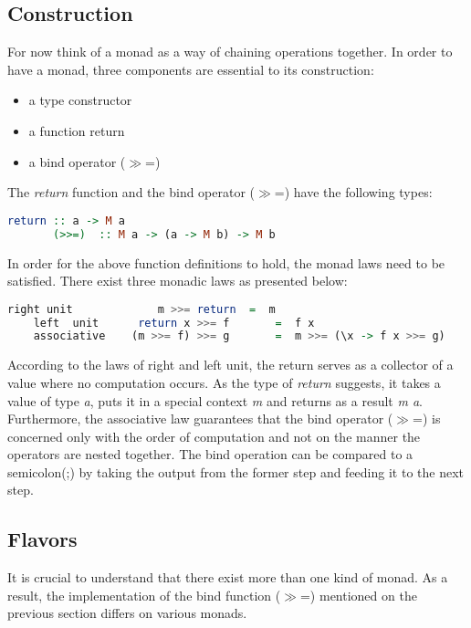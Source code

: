 \documentclass[a4paper, onecolumn]{article}
\begin{document}
    \subsection{Construction}
    For now think of a monad as a way of chaining operations together. 
    In order to have a monad, three components are essential to its construction: 
    \begin{itemize}
        \item a type constructor
        \item a function return
        \item a bind operator ($\gg$=)
    \end{itemize}
    The \textit{return} function and the bind operator ($\gg$=) have the following types: 
    \begin{tcolorbox}
      \begin{lstlisting}[language=Haskell]
       return :: a -> M a 
       (>>=)  :: M a -> (a -> M b) -> M b 
      \end{lstlisting}
    \end{tcolorbox}
    In order for the above function definitions to hold, the monad laws need to be satisfied. There exist three monadic laws as presented below: 
    \begin{tcolorbox}
      \begin{lstlisting}[language=Haskell]
    right unit             m >>= return  =  m 
    left  unit      return x >>= f       =  f x   
    associative    (m >>= f) >>= g       =  m >>= (\x -> f x >>= g) 
      \end{lstlisting}
    \end{tcolorbox}
    
    According to the laws of right and left unit, the return serves as a collector of a value where no computation occurs. As the type of \textit{return} suggests, it takes a value of type \textit{a}, puts it in a special context \textit{m} and returns as a result \textit{m a}. Furthermore, the associative law guarantees that the bind operator ($\gg$=) is concerned only with the order of computation and not on the manner the operators are nested together. The bind operation can be compared to a semicolon(;) by taking the output from the former step and feeding it to the next step.
    \subsection{Flavors}
    
    It is crucial to understand that there exist more than one kind of monad. As a result, the implementation of the bind function ($\gg$=) mentioned on the previous section differs on various monads. 
    
\end{document}
